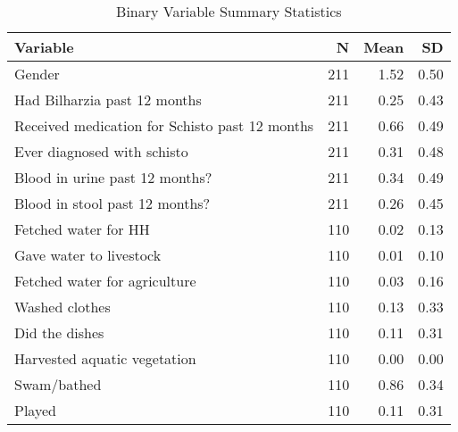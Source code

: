 \begin{table}[!t]
\caption*{
{\large Binary Variable Summary Statistics}
} 
\fontsize{12.0pt}{14.4pt}\selectfont
\begin{tabular*}{\linewidth}{@{\extracolsep{\fill}}lrrr}
\toprule
Variable & N & Mean & SD \\ 
\midrule\addlinespace[2.5pt]
Gender & 211 & 1.52 & 0.50 \\ 
Had Bilharzia past 12 months & 211 & 0.25 & 0.43 \\ 
Received medication for Schisto past 12 months & 211 & 0.66 & 0.49 \\ 
Ever diagnosed with schisto & 211 & 0.31 & 0.48 \\ 
Blood in urine past 12 months? & 211 & 0.34 & 0.49 \\ 
Blood in stool past 12 months? & 211 & 0.26 & 0.45 \\ 
Fetched water for HH & 110 & 0.02 & 0.13 \\ 
Gave water to livestock & 110 & 0.01 & 0.10 \\ 
Fetched water for agriculture & 110 & 0.03 & 0.16 \\ 
Washed clothes & 110 & 0.13 & 0.33 \\ 
Did the dishes & 110 & 0.11 & 0.31 \\ 
Harvested aquatic vegetation & 110 & 0.00 & 0.00 \\ 
Swam/bathed & 110 & 0.86 & 0.34 \\ 
Played & 110 & 0.11 & 0.31 \\ 
\bottomrule
\end{tabular*}
\end{table}

